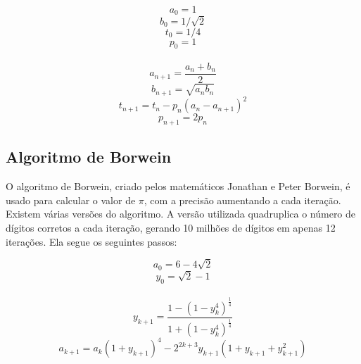 \documentclass[a4paper]{article}
\begin{document}
\begin{displaymath}
	a_0 = 1
\end{displaymath}
\begin{displaymath}
	b_0 = 1 / \sqrt{2}
\end{displaymath}
\begin{displaymath}
	t_0 = 1 / 4
\end{displaymath}
\begin{displaymath}
	p_0 = 1
\end{displaymath}
\\
\begin{displaymath}
	a_{n+1} = \frac{a_n + b_n}{2}
\end{displaymath}
\begin{displaymath}
	b_{n+1} = \sqrt{a_{n}b_{n}}
\end{displaymath}
\begin{displaymath}
	t_{n+1} = t_n - p_{n}(a_n - a_{n+1})^2
\end{displaymath}
\begin{displaymath}
	p_{n+1} = 2p_n
\end{displaymath}

\subsection{Algoritmo de Borwein}
O algoritmo de Borwein, criado pelos matemáticos Jonathan e Peter Borwein, é 
usado para calcular o valor de \begin{math}\pi\end{math}, com a precisão aumentando a cada iteração.
Existem várias versões do algoritmo. A versão utilizada quadruplica 
o número de dígitos corretos a cada iteração, gerando 10 milhões de dígitos em 
apenas 12 iterações. Ela segue os seguintes passos:

\begin{displaymath}
	a_0 = 6 - 4\sqrt{2}
\end{displaymath}
\begin{displaymath}
	y_0 = \sqrt{2} - 1
\end{displaymath}
\\
\begin{displaymath}
	y_{k+1} = \frac{1 - (1-y_k^4)^\frac{1}{4}}{1 + (1-y_k^4)^\frac{1}{4}}
\end{displaymath}
\begin{displaymath}
	a_{k+1} = a_k(1 + y_{k+1})^4 - 2^{2k+3}y_{k+1}(1 + y_{k+1} + y_{k+1}^2)
\end{displaymath}
\end{document}
